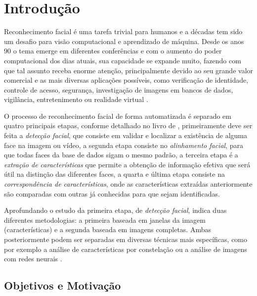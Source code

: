 
\chapter[Introdução]{Introdução}

Reconhecimento facial é uma tarefa trivial para humanos e a décadas tem sido um desafio para visão computacional e aprendizado de máquina. Desde os anos 90 \cite{appli2014} o tema emerge em diferentes conferências e com o aumento do poder computacional dos dias atuais, sua capacidade se expande muito, fazendo com que tal assunto receba enorme atenção, principalmente devido ao seu grande valor comercial e as mais diversas aplicações possíveis, como verificação de identidade, controle de acesso, segurança, investigação de imagens em bancos de dados, vigilância, entretenimento ou realidade virtual \cite{Zhao:2003:FRL:954339.954342}.

O processo de reconhecimento facial de forma automatizada é separado em quatro principais etapas, conforme detalhado no livro de  \cite{Li:2011:HFR:2073486}, primeiramente deve ser feita a \textit{detecção facial}, que consiste em validar e localizar a existência de alguma face na imagem ou vídeo, a segunda etapa consiste no \textit{alinhamento facial}, para que todas faces da base de dados sigam o mesmo padrão, a terceira etapa é a \textit{extração de características} que permite a obtenção de informação efetiva que será útil na distinção das diferentes faces, a quarta e última etapa consiste na \textit{correspondência de características}, onde as características extraídas anteriormente são comparadas com outras já conhecidas para que sejam identificadas.

Aprofundando o estudo da primeira etapa, de \textit{detecção facial},  \cite{faceDetection2001} indica duas diferentes metodologias: a primeira baseada em janelas da imagem (características) e a segunda baseada em imagens completas. Ambas posteriormente podem ser separadas em diversas técnicas mais específicas, como por exemplo a análise de características por constelação \cite{loy2006detecting} ou a análise de imagens com redes neurais \cite{cnn_face_detection}.

\section{Objetivos e Motivação}

